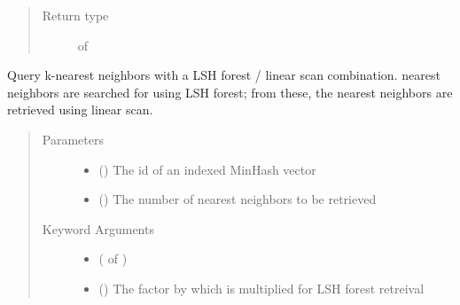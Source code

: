 \documentclass[letterpaper,10pt,english]{sphinxmanual}
\begin{document}
\begin{fulllineitems}
\begin{fulllineitems}
\begin{quote}
\begin{description}
\item[{Return type}] \leavevmode
{} of 

\end{description}\end{quote}

\end{fulllineitems}


\begin{fulllineitems}
\label{\detokenize{documentation:tmap.LSHForest.query_linear_scan_exclude_by_id}}
Query k-nearest neighbors with a LSH forest / linear scan combination.  nearest neighbors are searched for using LSH forest; from these, the  nearest neighbors are retrieved using linear scan.
\begin{quote}\begin{description}
\item[{Parameters}] \leavevmode\begin{itemize}
\item {} 
 () \textendash{} The id of an indexed MinHash vector

\item {} 
 () \textendash{} The number of nearest neighbors to be retrieved

\end{itemize}

\item[{Keyword Arguments}] \leavevmode\begin{itemize}
\item {} 
 ( of ) \textendash{} 

\item {} 
 () \textendash{} The factor by which  is multiplied for LSH forest retreival


\end{itemize}
\end{description}
\end{quote}
\end{fulllineitems}
\end{fulllineitems}
\end{document}
